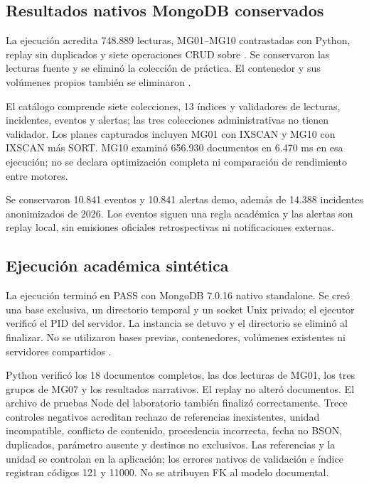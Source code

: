 \subsection{Resultados nativos MongoDB conservados}
La ejecución  acredita 748.889 lecturas,
MG01--MG10 contrastadas con Python, replay sin duplicados y siete operaciones
CRUD sobre . Se conservaron las lecturas fuente y se
eliminó la colección de práctica. El contenedor y sus volúmenes propios también
se eliminaron \cite{mongocierre}.

El catálogo comprende siete colecciones, 13 índices y validadores de lecturas,
incidentes, eventos y alertas; las tres colecciones administrativas no tienen
validador. Los planes capturados incluyen MG01 con IXSCAN y MG10 con IXSCAN más
SORT. MG10 examinó 656.930 documentos en 6.470 ms en esa ejecución; no se declara
optimización completa ni comparación de rendimiento entre motores.

Se conservaron 10.841 eventos y 10.841 alertas demo, además de 14.388 incidentes
anonimizados de 2026. Los eventos siguen una regla académica y las alertas son
replay local, sin emisiones oficiales retrospectivas ni notificaciones externas.

\subsection{Ejecución académica sintética}
La ejecución  terminó en PASS con MongoDB
7.0.16 nativo standalone. Se creó una base exclusiva, un directorio temporal y
un socket Unix privado; el ejecutor verificó el PID del servidor. La instancia
se detuvo y el directorio se eliminó al finalizar. No se utilizaron bases previas,
contenedores, volúmenes existentes ni servidores compartidos \cite{laboratorio}.

Python verificó los 18 documentos completos, las dos lecturas de MG01, los tres
grupos de MG07 y los resultados narrativos. El replay no alteró documentos.
El archivo de pruebas Node del laboratorio también finalizó correctamente.
Trece controles negativos acreditan rechazo de referencias inexistentes, unidad
incompatible, conflicto de contenido, procedencia incorrecta, fecha no BSON,
duplicados, parámetro ausente y destinos no exclusivos. Las referencias y la
unidad se controlan en la aplicación; los errores nativos de validación e índice
registran códigos 121 y 11000. No se atribuyen FK al modelo documental.

